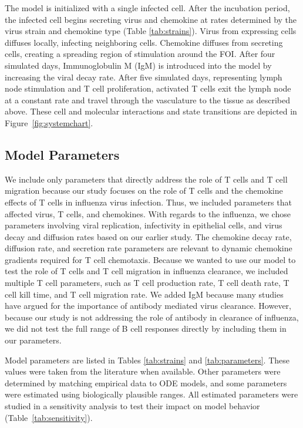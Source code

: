 \documentclass[preprint,10pt,authoryear]{elsarticle}
\begin{document}
The model is initialized with a single infected cell.  After the incubation period, the infected cell begins secreting virus and chemokine at rates determined by the virus strain and chemokine type (Table \ref{tab:strains}).  Virus from expressing cells diffuses locally, infecting neighboring cells. Chemokine diffuses from secreting cells, creating a spreading region of stimulation around the FOI. After four simulated days, Immunoglobulin M (IgM) is introduced into the model by increasing the viral decay rate.  After five simulated days, representing lymph node stimulation and T cell proliferation, activated T cells exit the lymph node at a constant rate and travel through the vasculature to the tissue as described above.  These cell and molecular interactions and state transitions are depicted in Figure~\ref{fig:systemchart}.

\subsection*{Model Parameters}

We include only parameters that directly address the role of T cells and T cell migration because our study focuses on the role of T cells and the chemokine effects of T cells in influenza virus infection. Thus, we included parameters that affected virus, T cells, and chemokines. With regards to the influenza, we chose parameters involving viral replication, infectivity in epithelial cells, and virus decay and diffusion rates based on our earlier study.  The chemokine decay rate, diffusion rate, and secretion rate parameters are relevant to dynamic chemokine gradients required for T cell chemotaxis.  Because we wanted to use our model to test the role of T cells and T cell migration in influenza clearance, we included multiple T cell parameters, such as T cell production rate, T cell death rate, T cell kill time, and T cell migration rate.  We added IgM because many studies have argued for the importance of antibody mediated virus clearance. However, because our study is not addressing the role of antibody in clearance of influenza, we did not test the full range of B cell responses directly by including them in our parameters.

Model parameters are listed in Tables \ref{tab:strains} and \ref{tab:parameters}. These values were taken from the literature when available.  Other parameters were determined by matching empirical data to ODE models, and some parameters were estimated using biologically plausible ranges.  All estimated parameters were studied in a sensitivity analysis to test their impact on model behavior (Table~\ref{tab:sensitivity}). 
\end{document}
